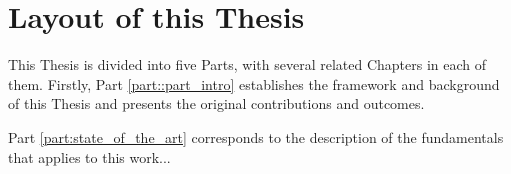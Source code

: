 \chapter{Layout of this Thesis}
\label{sect::structure}

This Thesis is divided into five Parts, with several related Chapters in each of them. Firstly, Part \ref{part::part_intro} establishes the framework and background of this Thesis and presents the original contributions and outcomes.

Part \ref{part:state_of_the_art} corresponds to the description of the fundamentals that applies to this work...